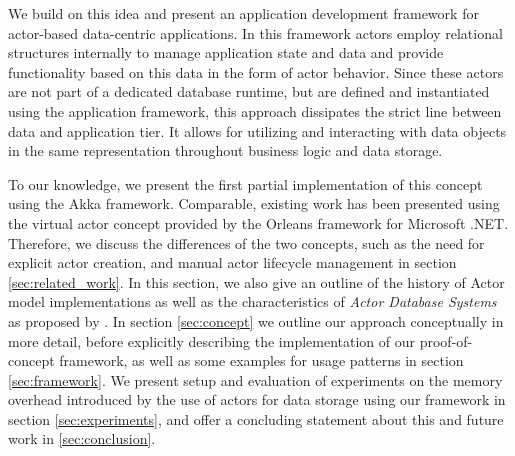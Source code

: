   We build on this idea and present an application development framework for actor-based data-centric applications.
  In this framework actors employ relational structures internally to manage application state and data
  and provide functionality based on this data in the form of actor behavior.
  Since these actors are not part of a dedicated database runtime, but are defined and instantiated using the application framework, this approach dissipates the strict line between data and application tier.
  It allows for utilizing and interacting with data objects in the same representation throughout business logic and data storage.

  To our knowledge, we present the first partial implementation of this concept using the Akka framework.
  Comparable, existing work has been presented using the virtual actor concept provided by the Orleans framework for Microsoft .NET.
  Therefore, we discuss the differences of the two concepts, such as the need for explicit actor creation, and manual actor lifecycle management in section \ref{sec:related_work}.
  In this section, we also give an outline of the history of Actor model implementations as well as the characteristics of \textit{Actor Database Systems} as proposed by \citeauthor{manifesto}.
  In section \ref{sec:concept} we outline our approach conceptually in more detail,
  before explicitly describing the implementation of our proof-of-concept framework, as well as some examples for usage patterns in section \ref{sec:framework}.
  We present setup and evaluation of experiments on the memory overhead introduced by the use of actors for data storage using our framework in section \ref{sec:experiments},
  and offer a concluding statement about this and future work in \ref{sec:conclusion}.
  
